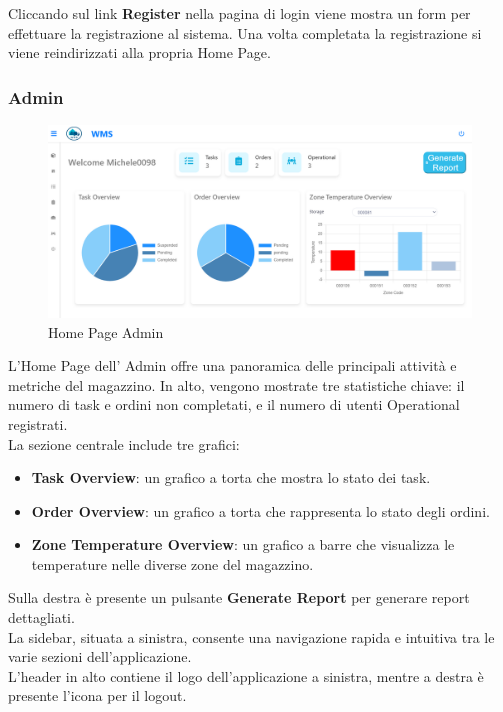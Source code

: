 Cliccando sul link \textbf{Register} nella pagina di login viene mostra un form per effettuare la registrazione al sistema.
Una volta completata la registrazione si viene reindirizzati alla propria Home Page.

\subsubsection{Admin}

\begin{figure}[H]
    \centering
    \includegraphics[width=\textwidth]{document/sections/img/Storyboard/homePageAdmin.png}
    \caption{Home Page Admin}
    \label{fig:homePageAdmins}
\end{figure}

L'Home Page dell' Admin offre una panoramica delle principali attività e metriche del magazzino.
In alto, vengono mostrate tre statistiche chiave: il numero di task e ordini non completati, e il numero di utenti
Operational registrati.\\

La sezione centrale include tre grafici:
\begin{itemize}
    \item \textbf{Task Overview}: un grafico a torta che mostra lo stato dei task.
    \item \textbf{Order Overview}: un grafico a torta che rappresenta lo stato degli ordini.
    \item \textbf{Zone Temperature Overview}: un grafico a barre che visualizza le temperature nelle diverse zone del magazzino.
\end{itemize}

Sulla destra è presente un pulsante \textbf{Generate Report} per generare report dettagliati.\\
La sidebar, situata a sinistra, consente una navigazione rapida e intuitiva tra le varie sezioni dell'applicazione.\\
L'header in alto contiene il logo dell'applicazione a sinistra, mentre a destra è presente l'icona per il logout.

